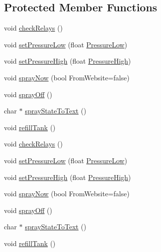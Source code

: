 \subsection*{Protected Member Functions}
\begin{DoxyCompactItemize}
\item 
void \hyperlink{class_aeroponics___tank_a4ee215af07d5ee08e2b12efc9a7e1db9}{check\+Relays} ()
\item 
void \hyperlink{class_aeroponics___tank_a336c8e22072118cd60d912b28df660fb}{set\+Pressure\+Low} (float \hyperlink{class_aeroponics___tank_aa0d7f59821df87a90452df405afb79c6}{Pressure\+Low})
\item 
void \hyperlink{class_aeroponics___tank_a6081920c94e5909b98c1f9aa85bcf108}{set\+Pressure\+High} (float \hyperlink{class_aeroponics___tank_ad5b7275a6f3b5f15041821fadb4e3a95}{Pressure\+High})
\item 
void \hyperlink{class_aeroponics___tank_ab4158b1a54f6a1ac4f3eb35fc8854e35}{spray\+Now} (bool From\+Website=false)
\item 
void \hyperlink{class_aeroponics___tank_aa97abbd76332098f8662b78c451deee5}{spray\+Off} ()
\item 
char $\ast$ \hyperlink{class_aeroponics___tank_a0c9c9616ee380d0e4dd0ccc41d7e7a0f}{spray\+State\+To\+Text} ()
\item 
void \hyperlink{class_aeroponics___tank_a95906ab4c83355062f26e898edbc2337}{refill\+Tank} ()
\item 
void \hyperlink{class_aeroponics___tank_a4ee215af07d5ee08e2b12efc9a7e1db9}{check\+Relays} ()
\item 
void \hyperlink{class_aeroponics___tank_a336c8e22072118cd60d912b28df660fb}{set\+Pressure\+Low} (float \hyperlink{class_aeroponics___tank_aa0d7f59821df87a90452df405afb79c6}{Pressure\+Low})
\item 
void \hyperlink{class_aeroponics___tank_a6081920c94e5909b98c1f9aa85bcf108}{set\+Pressure\+High} (float \hyperlink{class_aeroponics___tank_ad5b7275a6f3b5f15041821fadb4e3a95}{Pressure\+High})
\item 
void \hyperlink{class_aeroponics___tank_ab4158b1a54f6a1ac4f3eb35fc8854e35}{spray\+Now} (bool From\+Website=false)
\item 
void \hyperlink{class_aeroponics___tank_aa97abbd76332098f8662b78c451deee5}{spray\+Off} ()
\item 
char $\ast$ \hyperlink{class_aeroponics___tank_a822daf2443f3326cc4ba1ab1ba0c02f2}{spray\+State\+To\+Text} ()
\item 
void \hyperlink{class_aeroponics___tank_a95906ab4c83355062f26e898edbc2337}{refill\+Tank} ()
\end{DoxyCompactItemize}
